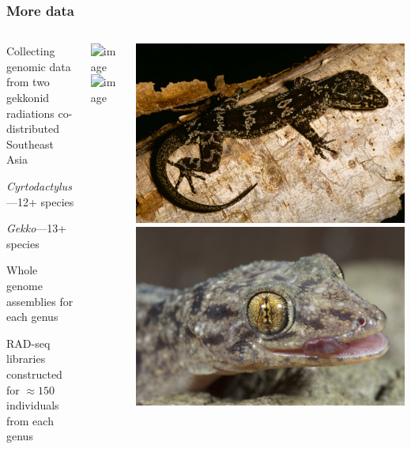 \begin{frame}
    \frametitle{More data}
    \begin{columns}[c]
        \begin{myitemize}
            \item Collecting genomic data from two gekkonid radiations
                co-distributed Southeast Asia
            \begin{myitemize}
                \item \emph{Cyrtodactylus}---12+ species
                \item \emph{Gekko}---13+ species
            \end{myitemize}
            \item Whole genome assemblies for each genus
            \item RAD-seq libraries constructed for $\approx150$ individuals
                from each genus
        \end{myitemize}
        \centerline{
        \includegraphics<1->[height=2.5cm]{../../../../Dropbox/field-photos/misc/lee-and-me.jpg}
        \hspace{2mm}
        \includegraphics<1->[height=2.5cm]{../../../../Dropbox/field-photos/people/rafe.jpg}}
        \includegraphics[width=\textwidth]{../images/photos/cyrt-agusanensis.jpg} \quad
        \includegraphics[width=\textwidth]{../images/photos/gekko-mindorensis.jpg}
    \end{columns}
\end{frame}

